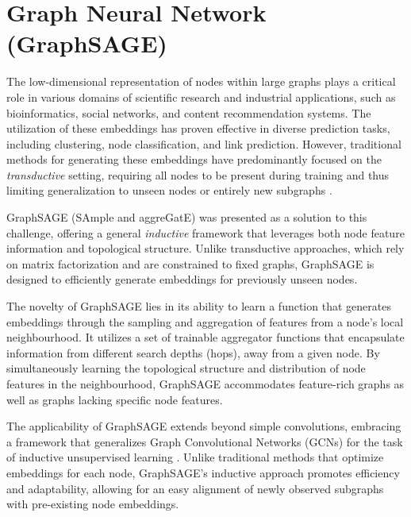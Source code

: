 \documentclass[
11pt, %
oneside, %
english, %
singlespacing, %
headsepline, %
chapterinoneline, %
]{MastersDoctoralThesis} %
\begin{document}
\section{Graph Neural Network (GraphSAGE)}\label{sec:theory:HinSAGE}
The low-dimensional representation of nodes within large graphs plays a critical role in various domains of scientific research and industrial applications, such as bioinformatics, social networks, and content recommendation systems. The utilization of these embeddings has proven effective in diverse prediction tasks, including clustering, node classification, and link prediction. However, traditional methods for generating these embeddings have predominantly focused on the \textit{transductive} setting, requiring all nodes to be present during training and thus limiting generalization to unseen nodes or entirely new subgraphs \cite{groverNode2vecScalableFeature2016, perozziDeepWalkOnlineLearning2014}.

GraphSAGE (SAmple and aggreGatE) \cite{hamiltonInductiveRepresentationLearning2017} was presented as a solution to this challenge, offering a general \textit{inductive} framework that leverages both node feature information and topological structure. Unlike transductive approaches, which rely on matrix factorization and are constrained to fixed graphs, GraphSAGE is designed to efficiently generate embeddings for previously unseen nodes.

The novelty of GraphSAGE lies in its ability to learn a function that generates embeddings through the sampling and aggregation of features from a node's local neighbourhood. It utilizes a set of trainable aggregator functions that encapsulate information from different search depths (hops), away from a given node. By simultaneously learning the topological structure and distribution of node features in the neighbourhood, GraphSAGE accommodates feature-rich graphs as well as graphs lacking specific node features.

The applicability of GraphSAGE extends beyond simple convolutions, embracing a framework that generalizes Graph Convolutional Networks (GCNs) for the task of inductive unsupervised learning \cite{kipfSemiSupervisedClassificationGraph2016}. Unlike traditional methods that optimize embeddings for each node, GraphSAGE's inductive approach promotes efficiency and adaptability, allowing for an easy alignment of newly observed subgraphs with pre-existing node embeddings.
\end{document}
